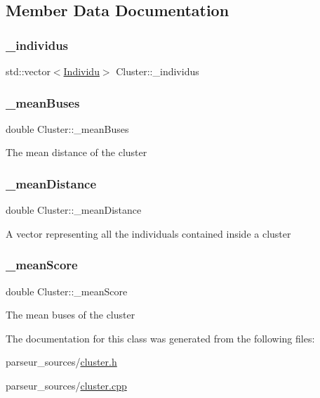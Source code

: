 \subsection{Member Data Documentation}
\mbox{\label{class_cluster_ab5145f01fde3720b93e2a04d2717e9af}} 
\subsubsection{\texorpdfstring{\+\_\+individus}{\_individus}}
{\footnotesize\ttfamily std\+::vector$<$\hyperlink{class_individu}{Individu}$>$ Cluster\+::\+\_\+individus\hspace{0.3cm}{\ttfamily [protected]}}

\mbox{\label{class_cluster_afbbaa003e21c0ddaea31bd1884d343b5}} 
\subsubsection{\texorpdfstring{\+\_\+mean\+Buses}{\_meanBuses}}
{\footnotesize\ttfamily double Cluster\+::\+\_\+mean\+Buses\hspace{0.3cm}{\ttfamily [protected]}}

The mean distance of the cluster \mbox{\label{class_cluster_a5f5ee52e489d25ca51debbb0c8f51a61}} 
\subsubsection{\texorpdfstring{\+\_\+mean\+Distance}{\_meanDistance}}
{\footnotesize\ttfamily double Cluster\+::\+\_\+mean\+Distance\hspace{0.3cm}{\ttfamily [protected]}}

A vector representing all the individuals contained inside a cluster \mbox{\label{class_cluster_ad4ed0c777b3e31bcdfa670b9c6fe63d9}} 
\subsubsection{\texorpdfstring{\+\_\+mean\+Score}{\_meanScore}}
{\footnotesize\ttfamily double Cluster\+::\+\_\+mean\+Score\hspace{0.3cm}{\ttfamily [protected]}}

The mean buses of the cluster 

The documentation for this class was generated from the following files\+:\begin{DoxyCompactItemize}
\item 
parseur\+\_\+sources/\hyperlink{cluster_8h}{cluster.\+h}\item 
parseur\+\_\+sources/\hyperlink{cluster_8cpp}{cluster.\+cpp}\end{DoxyCompactItemize}
